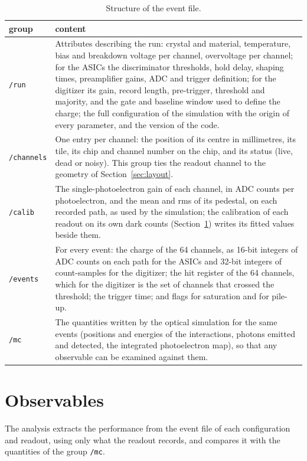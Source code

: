\documentclass[11pt]{article}
\newcommand{\code}[1]{\texttt{#1}}
\begin{document}
\begin{table}[htb]
\centering
\small
\begin{tabular}{p{} p{}}
\toprule
group & content \\
\midrule
\code{/run} & Attributes describing the run: crystal and material,
temperature, bias and breakdown voltage per channel, overvoltage per
channel; for the ASICs the discriminator thresholds, hold delay, shaping
times, preamplifier gains, ADC and trigger definition; for the digitizer
its gain, record length, pre-trigger, threshold and majority, and the gate
and baseline window used to define the charge; the full configuration of
the simulation with the origin of every parameter, and the version of the
code. \\
\code{/channels} & One entry per channel: the position of its centre in
millimetres, its tile, its chip and channel number on the chip, and its
status (live, dead or noisy). This group ties the readout channel to the
geometry of Section~\ref{sec:layout}. \\
\code{/calib} & The single-photoelectron gain of each channel, in ADC counts
per photoelectron, and the mean and rms of its pedestal, on each recorded
path, as used by the simulation; the calibration of each readout on its own
dark counts (Section~\ref{sec:comparison}) writes its fitted values beside
them. \\
\code{/events} & For every event: the charge of the 64 channels, as 16-bit
integers of ADC counts on each path for the ASICs and 32-bit integers of
count-samples for the digitizer; the hit register of the 64 channels, which
for the digitizer is the set of channels that crossed the threshold; the
trigger time; and flags for saturation and for pile-up. \\
\code{/mc} & The quantities written by the optical simulation for the same
events (positions and energies of the interactions, photons emitted and
detected, the integrated photoelectron map), so that any observable can be
examined against them. \\
\bottomrule
\end{tabular}
\caption{Structure of the event file.}
\label{tab:eventfile}
\end{table}

\section{Observables}
\label{sec:comparison}

The analysis extracts the performance from the event file of each
configuration and readout, using only what the readout records, and
compares it with the quantities of the group \code{/mc}.
\end{document}

